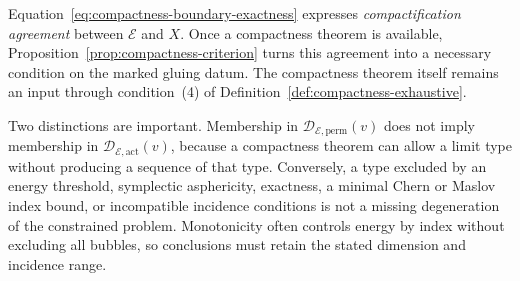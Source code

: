 \documentclass[11pt,letterpaper,twoside]{article}
\theoremstyle{plain}
\theoremstyle{definition}
\theoremstyle{remark}
\begin{document}
Equation~\eqref{eq:compactness-boundary-exactness} expresses \emph{compactification agreement} between $\mathcal E$ and $X$.  Once a compactness theorem is available, Proposition~\ref{prop:compactness-criterion} turns this agreement into a necessary condition on the marked gluing datum.  The compactness theorem itself remains an input through condition~(4) of Definition~\ref{def:compactness-exhaustive}.

Two distinctions are important.  Membership in $\mathcal D_{\mathcal E,\mathrm{perm}}(v)$ does not imply membership in $\mathcal D_{\mathcal E,\mathrm{act}}(v)$, because a compactness theorem can allow a limit type without producing a sequence of that type.  Conversely, a type excluded by an energy threshold, symplectic asphericity, exactness, a minimal Chern or Maslov index bound, or incompatible incidence conditions is not a missing degeneration of the constrained problem.  Monotonicity often controls energy by index without excluding all bubbles, so conclusions must retain the stated dimension and incidence range.
\end{document}

